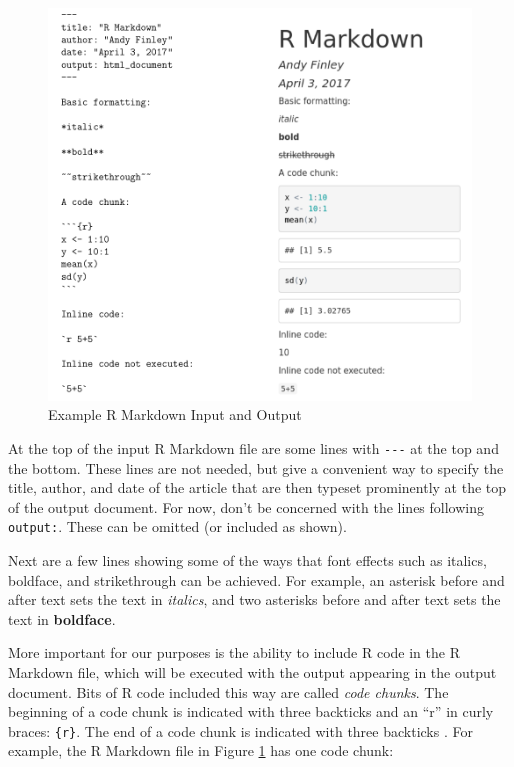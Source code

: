 \documentclass[]{krantz}
\theoremstyle{definition}
\theoremstyle{definition}
\theoremstyle{definition}
\theoremstyle{remark}
\begin{document}
\begin{figure}

{\centering \includegraphics[width=1\linewidth]{03-scripts/03-images/rmarkdownInputOutput} 

}

\caption{Example R Markdown Input and Output}\label{fig:rmark}
\end{figure}

At the top of the input R Markdown file are some lines with
\texttt{-\/-\/-} at the top and the bottom. These lines are not needed,
but give a convenient way to specify the title, author, and date of the
article that are then typeset prominently at the top of the output
document. For now, don't be concerned with the lines following
\texttt{output:}. These can be omitted (or included as shown).

Next are a few lines showing some of the ways that font effects such as
italics, boldface, and strikethrough can be achieved. For example, an
asterisk before and after text sets the text in \emph{italics}, and two
asterisks before and after text sets the text in \textbf{boldface}.

More important for our purposes is the ability to include R code in the
R Markdown file, which will be executed with the output appearing in the
output document. Bits of R code included this way are called \emph{code
chunks}. The beginning of a code chunk is indicated with three backticks
and an ``r'' in curly braces:
\texttt{\textasciigrave{}\textasciigrave{}\textasciigrave{}\{r\}}. The
end of a code chunk is indicated with three backticks
\texttt{\textasciigrave{}\textasciigrave{}\textasciigrave{}}. For
example, the R Markdown file in Figure \ref{fig:rmark} has one code
chunk:
\end{document}
